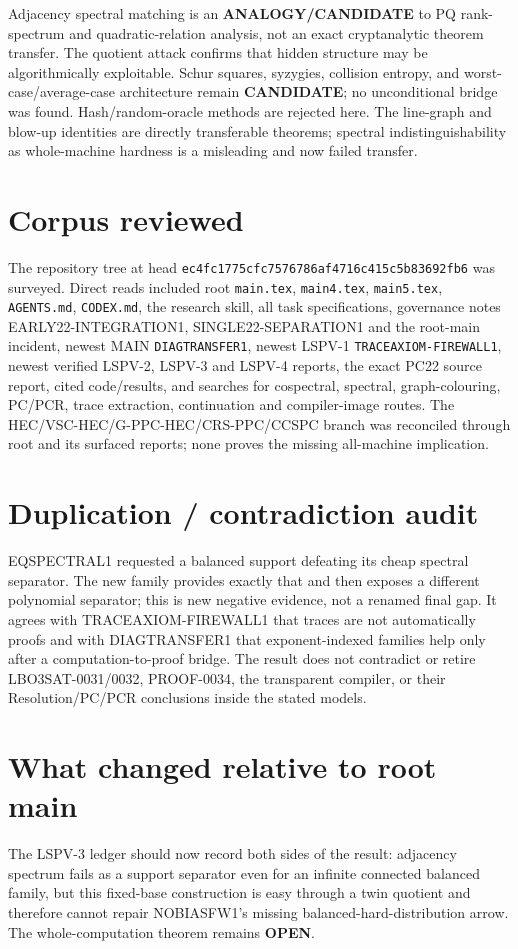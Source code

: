 \documentclass[11pt]{article}
\newcommand{\st}[1]{\textbf{#1}}
\begin{document}
Adjacency spectral matching is an \st{ANALOGY/CANDIDATE} to PQ rank-spectrum and
quadratic-relation analysis, not an exact cryptanalytic theorem transfer.  The quotient
attack confirms that hidden structure may be algorithmically exploitable.  Schur
squares, syzygies, collision entropy, and worst-case/average-case architecture remain
\st{CANDIDATE}; no unconditional bridge was found.  Hash/random-oracle methods are
rejected here.  The line-graph and blow-up identities are directly transferable
theorems; spectral indistinguishability as whole-machine hardness is a misleading and
now failed transfer.

\section{Corpus reviewed}
The repository tree at head \texttt{ec4fc1775cfc7576786af4716c415c5b83692fb6}
was surveyed.  Direct reads included root \texttt{main.tex}, \texttt{main4.tex},
\texttt{main5.tex}, \texttt{AGENTS.md}, \texttt{CODEX.md}, the research skill, all
task specifications, governance notes EARLY22-INTEGRATION1, SINGLE22-SEPARATION1 and
the root-main incident, newest MAIN \texttt{DIAGTRANSFER1}, newest LSPV-1
\texttt{TRACEAXIOM-FIREWALL1}, newest verified LSPV-2, LSPV-3 and LSPV-4 reports, the
exact PC22 source report, cited code/results, and searches for cospectral, spectral,
graph-colouring, PC/PCR, trace extraction, continuation and compiler-image routes.
The HEC/VSC-HEC/G-PPC-HEC/CRS-PPC/CCSPC branch was reconciled through root and its
surfaced reports; none proves the missing all-machine implication.

\section{Duplication / contradiction audit}
EQSPECTRAL1 requested a balanced support defeating its cheap spectral separator.  The
new family provides exactly that and then exposes a different polynomial separator;
this is new negative evidence, not a renamed final gap.  It agrees with
TRACEAXIOM-FIREWALL1 that traces are not automatically proofs and with DIAGTRANSFER1
that exponent-indexed families help only after a computation-to-proof bridge.  The
result does not contradict or retire LBO3SAT-0031/0032, PROOF-0034, the transparent
compiler, or their Resolution/PC/PCR conclusions inside the stated models.

\section{What changed relative to root main}
The LSPV-3 ledger should now record both sides of the result: adjacency spectrum fails
as a support separator even for an infinite connected balanced family, but this
fixed-base construction is easy through a twin quotient and therefore cannot repair
NOBIASFW1's missing balanced-hard-distribution arrow.  The whole-computation theorem
remains \st{OPEN}.
\end{document}
